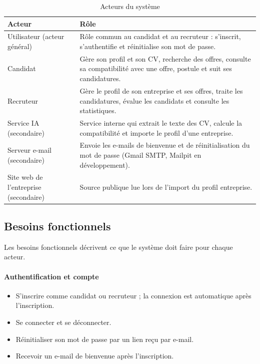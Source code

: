 \documentclass[12pt,a4paper]{report}
\newcommand{\thead}[1]{\textbf{#1}}
\begin{document}
\begin{table}[H]
\centering
\begin{tabularx}{\textwidth}{|p{3.4cm}|L|}
\hline
{}\thead{Acteur} & \thead{Rôle} \\ \hline
Utilisateur \newline \footnotesize(acteur général) & Rôle commun au candidat et au recruteur : s'inscrit, s'authentifie et réinitialise son mot de passe. \\ \hline
Candidat & Gère son profil et son CV, recherche des offres, consulte sa compatibilité avec une offre, postule et suit ses candidatures. \\ \hline
Recruteur & Gère le profil de son entreprise et ses offres, traite les candidatures, évalue les candidats et consulte les statistiques. \\ \hline
Service IA \newline \footnotesize(secondaire) & Service interne qui extrait le texte des CV, calcule la compatibilité et importe le profil d'une entreprise. \\ \hline
Serveur e-mail \newline \footnotesize(secondaire) & Envoie les e-mails de bienvenue et de réinitialisation du mot de passe (Gmail SMTP, Mailpit en développement). \\ \hline
Site web de l'entreprise \newline \footnotesize(secondaire) & Source publique lue lors de l'import du profil entreprise. \\ \hline
\end{tabularx}
\caption{Acteurs du système}
\label{tab:acteurs}
\end{table}

\subsection{Besoins fonctionnels}
Les besoins fonctionnels décrivent ce que le système doit faire pour chaque acteur.

\paragraph{Authentification et compte}
\begin{itemize}
  \item S'inscrire comme candidat ou recruteur ; la connexion est automatique après l'inscription.
  \item Se connecter et se déconnecter.
  \item Réinitialiser son mot de passe par un lien reçu par e-mail.
  \item Recevoir un e-mail de bienvenue après l'inscription.
\end{itemize}
\end{document}
